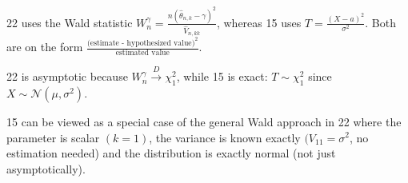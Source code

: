 \documentclass[10pt]{article}
\begin{document}
22 uses the Wald statistic $W_n^\gamma = \frac{n(\hat{\theta}_{n, k} - \gamma)^2}{\hat{V}_{n, kk}} $, whereas 15 uses $T = \frac{(X - a)^2}{\sigma^2}$. Both are on the form $\frac{\text{(estimate - hypothesized value)}^2}{\text{estimated value}}$.

22 is asymptotic because $W_n^\gamma \xrightarrow{D}\chi_1^2 $, while 15 is exact: $T \sim\chi_1^2 $ since $X \sim \mathcal{N}(\mu, \sigma^2)$.

15 can be viewed as a special case of the general Wald approach in 22 where the parameter is scalar $(k = 1)$, the variance is known exactly $(V_{11} = \sigma^2$, no estimation needed) and the distribution is exactly normal (not just asymptotically).

\newpage 



\end{document}
